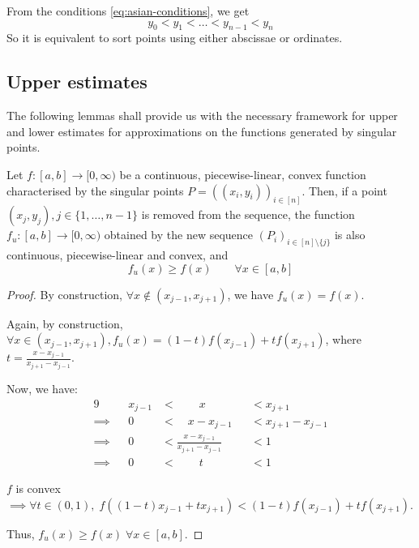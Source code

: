 \begin{rem}
	From the conditions \ref{eq:asian-conditions}, we get
	\begin{equation*}
		y_0 < y_1 < \dots < y_{n-1} < y_n
	\end{equation*}
	So it is equivalent to sort points using either abscissae or ordinates.
\end{rem}



\subsection{Upper estimates}
\label{subsec:asian-upper-estimates}

The following lemmas shall provide us with the necessary framework for upper and lower estimates for approximations on the functions generated by singular points.

\begin{lmm}
	\label{lmm:asian-upper-estimate}
	Let $ f:[a,b] \to [0, \infty) $ be a continuous, piecewise-linear, convex function characterised by the singular points $ P = ( (x_i, y_i) )_{i \in [n]} $. Then, if a point $ (x_j, y_j), j \in \{ 1, \dots, n-1\} $ is removed from the sequence, the function $ f_u: [a,b] \to [0, \infty) $ obtained by the new sequence $ (P_i)_{i \in [n] \setminus \{ j \}} $ is also continuous, piecewise-linear and convex, and
	\begin{equation}
		f_u(x) \ge f(x) \qquad \forall x \in [a,b]
	\end{equation}
\end{lmm}

\begin{proof}
	By construction, $ \forall x \notin ( x_{j-1} , x_{j+1} ) $, we have $ f_u(x) = f(x) $.
	
	Again, by construction, $ \forall x \in ( x_{j-1} , x_{j+1} ), f_u(x) = (1-t) f(x_{j-1}) + t f(x_{j+1}) $, where $ t = \frac{ x - x_{j-1} }{ x_{j+1} - x_{j-1} } $.
	
	Now, we have:
	\begin{alignat*}{9}
		          && x_{j-1}  & <  \qquad x          && <  x_{j+1} \\
		\implies  &&       0  & <  \quad x - x_{j-1} && <  x_{j+1} - x_{j-1} \\
		\implies  &&       0  & <  \frac{ x - x_{j-1} }{ x_{j+1} - x_{j-1} } && <  1 \\
		\implies  &&       0  & <  \qquad t          && <  1
	\end{alignat*}
	
	$f$ is convex $\implies \forall t \in (0,1), \; f( (1-t) x_{j-1} + t x_{j+1} ) < (1-t) f(x_{j-1}) + t f(x_{j+1}) $.
	
	Thus, $ f_u(x) \ge f(x) \; \forall x \in [a,b]$.
\end{proof}

